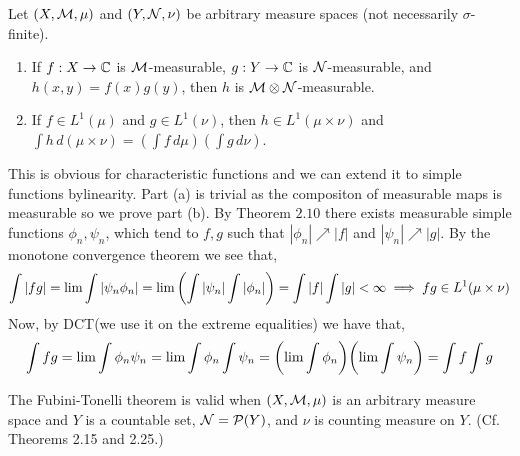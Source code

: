 \documentclass[12pt,a4paper]{article}
\begin{document}
\begin{problem}\label{prob:2-51}
Let $(X, \mathcal{M}, \mu)$ and $(Y, \mathcal{N}, \nu)$ be arbitrary measure spaces (not necessarily $\sigma$-finite).
\begin{enumerate}[label=\alph*.]
    \item If $f: X \to \mathbb{C}$ is $\mathcal{M}$-measurable, $g: Y \to \mathbb{C}$ is $\mathcal{N}$-measurable, and $h(x, y) = f(x)g(y)$, then $h$ is $\mathcal{M} \otimes \mathcal{N}$-measurable.
    \item If $f \in L^1(\mu)$ and $g \in L^1(\nu)$, then $h \in L^1(\mu \times \nu)$ and $\int h \, d(\mu \times \nu) = (\int f \, d\mu)(\int g \, d\nu)$.
\end{enumerate}
\end{problem}
\begin{solution}
    This is obvious for characteristic functions and we can extend it to simple functions bylinearity. 
	Part (a) is trivial as the compositon of measurable maps is measurable so we prove part (b). 
	By Theorem $2.10$ there exists measurable simple functions $\phi_n,\psi_n$,  which tend to $f,g$ such that $|\phi_n|\nearrow|f|$ and $|\psi_n|\nearrow|g|$. 
	By the monotone convergence theorem we see that,
	\[
		\int|fg|=\lim\int|\psi_n\phi_n|=\lim\qty(\int|\psi_n|\int|\phi_n|)=\int|f|\int|g|<\infty\implies fg\in L^1(\mu\times\nu)
	\]
	Now, by DCT(we use it on the extreme equalities) we have that,
	\[
		\int fg=\lim\int \phi_n\psi_n=\lim\int\phi_n\int\psi_n=\qty(\lim\int\phi_n)\qty(\lim\int\psi_n)=\int f\int g
	\]
\end{solution}
\begin{problem}\label{prob:2-52}
The Fubini-Tonelli theorem is valid when $(X, \mathcal{M}, \mu)$ is an arbitrary measure space and $Y$ is a countable set, $\mathcal{N} = \mathcal{P}(Y)$, and $\nu$ is counting measure on $Y$. (Cf. Theorems 2.15 and 2.25.)
\end{problem}
\end{document}
